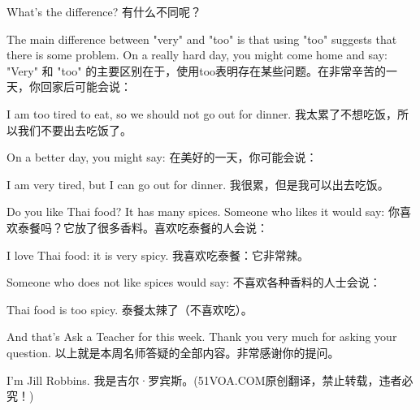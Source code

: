 What's the difference?
有什么不同呢？

The main difference between "very" and "too" is that using "too" suggests that there is some problem. On a really hard day, you might come home and say:
"Very" 和 "too" 的主要区别在于，使用too表明存在某些问题。在非常辛苦的一天，你回家后可能会说：

I am too tired to eat, so we should not go out for dinner.
我太累了不想吃饭，所以我们不要出去吃饭了。

On a better day, you might say:
在美好的一天，你可能会说：

I am very tired, but I can go out for dinner.
我很累，但是我可以出去吃饭。

Do you like Thai food? It has many spices. Someone who likes it would say:
你喜欢泰餐吗？它放了很多香料。喜欢吃泰餐的人会说：

I love Thai food: it is very spicy.
我喜欢吃泰餐：它非常辣。

Someone who does not like spices would say:
不喜欢各种香料的人士会说：

Thai food is too spicy.
泰餐太辣了（不喜欢吃）。

And that's Ask a Teacher for this week. Thank you very much for asking your question.
以上就是本周名师答疑的全部内容。非常感谢你的提问。

I'm Jill Robbins.
我是吉尔·罗宾斯。(51VOA.COM原创翻译，禁止转载，违者必究！)
